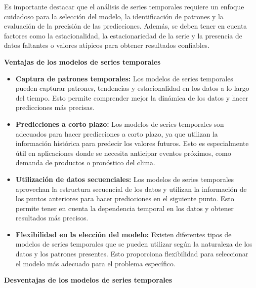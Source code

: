 Es importante destacar que el análisis de series temporales requiere un enfoque cuidadoso para la selección del modelo, la identificación de patrones y la evaluación de la precisión de las predicciones. Además, se deben tener en cuenta factores como la estacionalidad, la estacionariedad de la serie y la presencia de datos faltantes o valores atípicos para obtener resultados confiables.

\textbf{Ventajas de los modelos de series temporales}

\begin{itemize}
    \item \textbf{Captura de patrones temporales:} Los modelos de series temporales pueden capturar patrones, tendencias y estacionalidad en los datos a lo largo del tiempo. Esto permite comprender mejor la dinámica de los datos y hacer predicciones más precisas.
    \item \textbf{Predicciones a corto plazo:} Los modelos de series temporales son adecuados para hacer predicciones a corto plazo, ya que utilizan la información histórica para predecir los valores futuros. Esto es especialmente útil en aplicaciones donde se necesita anticipar eventos próximos, como demanda de productos o pronóstico del clima.
    \item \textbf{Utilización de datos secuenciales:} Los modelos de series temporales aprovechan la estructura secuencial de los datos y utilizan la información de los puntos anteriores para hacer predicciones en el siguiente punto. Esto permite tener en cuenta la dependencia temporal en los datos y obtener resultados más precisos.
    \item \textbf{Flexibilidad en la elección del modelo:} Existen diferentes tipos de modelos de series temporales que se pueden utilizar según la naturaleza de los datos y los patrones presentes. Esto proporciona flexibilidad para seleccionar el modelo más adecuado para el problema específico.
\end{itemize}

\textbf{Desventajas de los modelos de series temporales}

